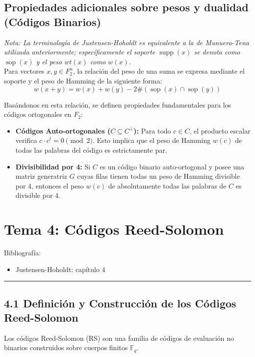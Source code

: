 \documentclass{article}
\newcommand{\hlinecolor}{\noindent\textcolor{azuloscuro}{\rule{\textwidth}{1pt}}}
\begin{document}
\subsection{Propiedades adicionales sobre pesos y dualidad (Códigos Binarios)}

\textit{Nota: La terminología de Justensen-Hoholdt es equivalente a la de Munuera-Tena utilizada anteriormente; específicamente el soporte $\operatorname{supp}(x)$ se denota como $\operatorname{sop}(x)$ y el peso $wt(x)$ como $w(x)$.} \\

Para vectores $x, y \in F_2^n$, la relación del peso de una suma se expresa mediante el soporte y el peso de Hamming de la siguiente forma:
\[
w(x+y) = w(x) + w(y) - 2\#(\operatorname{sop}(x) \cap \operatorname{sop}(y))
\]

Basándonos en esta relación, se definen propiedades fundamentales para los códigos ortogonales en $F_2$:

\begin{itemize}
    \item \textbf{Códigos Auto-ortogonales ($C \subseteq C^\perp$):} Para todo $c \in C$, el producto escalar verifica $c \cdot c^t = 0 \pmod 2$. Esto implica que el peso de Hamming $w(c)$ de todas las palabras del código es estrictamente par.
    \item \textbf{Divisibilidad por 4:} Si $C$ es un código binario auto-ortogonal y posee una matriz generatriz $G$ cuyas filas tienen todas un peso de Hamming divisible por 4, entonces el peso $w(c)$ de absolutamente todas las palabras de $C$ es divisible por 4.
\end{itemize}

\newpage
\section{Tema 4: Códigos Reed-Solomon}
Bibliografía:
\begin{itemize}
\item Justensen-Hoholdt: capítulo 4
\end{itemize}
\hlinecolor{}
\vspace{0.5cm}

\subsection{4.1 Definición y Construcción de los Códigos Reed-Solomon}

Los códigos Reed-Solomon (RS) son una familia de códigos de evaluación no binarios construidos sobre cuerpos finitos $\mathbb{F}_q$.
\end{document}
